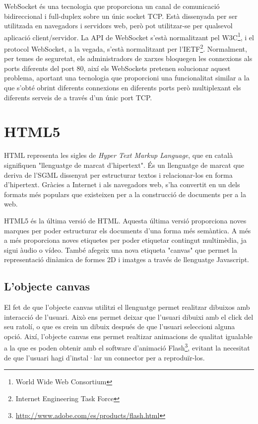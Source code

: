 WebSocket és una tecnologia que proporciona un canal de comunicació bidireccional i full-duplex sobre un únic socket TCP. Està dissenyada per ser utilitzada en navegadors i servidors web, però pot utilitzar-se per qualsevol aplicació client/servidor. La API de WebSocket s'està normalitzant pel W3C\footnote{World Wide Web Consortium}, i el protocol WebSocket, a la vegada, s'està normalitzant per l'IETF\footnote{Internet Engineering Task Force}. Normalment, per temes de seguretat, els administradors de xarxes bloquegen les connexions als ports diferents del port 80, així els WebSockets pretenen solucionar aquest problema, aportant una tecnologia que proporcioni una funcionalitat similar a la que s'obté obrint diferents connexions en diferents ports però multiplexant els diferents serveis de a través d'un únic port TCP.

\section{HTML5}

HTML representa les sigles de \emph{Hyper Text Markup Language}, que en català signifiquen "llenguatge de marcat d'hipertext". És un llenguatge de marcat que deriva de l'SGML dissenyat per estructurar textos i relacionar-los en forma d'hipertext. Gràcies a Internet i als navegadors web, s'ha convertit en un dels formats més populars que existeixen per a la construcció de documents per a la web. 

HTML5 és la última versió de HTML. Aquesta última versió proporciona noves marques per poder estructurar els documents d'una forma més semàntica. A més a més proporciona noves etiquetes per poder etiquetar contingut multimèdia, ja sigui àudio o vídeo. També afegeix una nova etiqueta "canvas" que permet la representació dinàmica de formes 2D i imatges a través de llenguatge Javascript. 

\subsection{L'objecte canvas}

El fet de que l'objecte canvas utilitzi el llenguatge permet realitzar dibuixos amb interacció de l'usuari. Això ens permet deixar que l'usuari dibuixi amb el click del seu ratolí, o que es crein un dibuix después de que l'usuari seleccioni alguna opció. Així, l'objecte canvas ens permet realtizar animacions de qualitat igualable a la que es poden obtenir amb el software d'animació Flash\footnote{\url{http://www.adobe.com/es/products/flash.html}}, evitant la necesitat de que l'usuari hagi d'instal·lar un connector per a reproduïr-los. 

